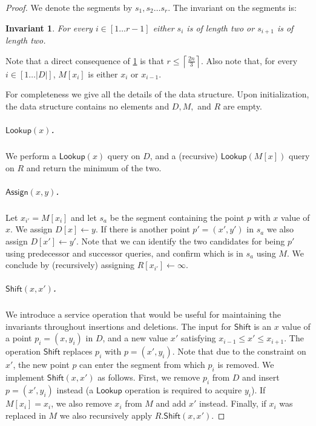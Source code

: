 \documentclass[a4paper,UKenglish,cleveref, autoref, thm-restate]{lipics-v2021}
\newcommand{\assign}{\leftarrow}
\newcommand{\AssignOp}{\mathsf{Assign}}
\newcommand{\ShiftOp}{\mathsf{Shift}}
\newcommand{\Lookup}{\mathsf{Lookup}}
\newcommand{\para}[1]{\vspace{-0.1in} \subparagraph*{#1}}
\newcommand{\ceil}[1]{\left\lceil{#1}\right\rceil}
\newtheorem{invariant}{Invariant}
\begin{document}
\begin{proof}
We denote the segments by $s_1,s_2 \ldots s_r$. The invariant on the segments is:
\begin{invariant}\label{inv:addminsegments}
    For every $i\in[1\ldots r-1]$ either $s_i$ is of length two or $s_{i+1}$ is of length two.
\end{invariant}
Note that a direct consequence of \cref{inv:addminsegments} is that $r \le \ceil{\frac{2n}{3}}$.
Also note that, for every $i\in [1\ldots |D|]$, $M[x_i]$ is either $x_i$ or $x_{i-1}$. 

For completeness we give all the details of the data structure.
Upon initialization, the data structure contains no elements and $D,M,$ and $R$ are empty.

\para{$\Lookup(x)$.}
We perform a $\Lookup(x)$ query on $D$, and a (recursive) $\Lookup(M[x])$ query on $R$ and return the minimum of the two.

\para{$\AssignOp(x,y)$.}
Let $x_{i'}=M[x_i]$ and let $s_a$ be the segment containing the point $p$ with $x$ value of $x$.
We assign $D[x] \assign y$. If there is another point $p'=(x',y')$ in $s_a$ we also  assign $D[x']\assign y'$.
Note that we can identify the two candidates for being $p'$ using predecessor and successor queries, and confirm which is in $s_a$ using $M$.
We conclude by (recursively) assigning $R[x_{i'}]\assign \infty$.

\para{$\ShiftOp(x,x')$.}
We introduce a service operation that would be useful for maintaining the invariants throughout insertions and deletions.
The input for $\ShiftOp$ is an $x$ value of a point $p_i = (x,y_i)$ in $D$, and a new value $x'$ satisfying $x_{i-1} \le  x' \le x_{i+1}$.
The operation $\ShiftOp$ replaces $p_i$ with $p = (x',y_i)$.
Note that due to the constraint on $x'$, the new point $p$ can enter the segment from which $p_i$ is removed.
We implement $\ShiftOp(x,x')$ as follows.
First, we remove $p_i$ from $D$ and insert $p = (x',y_i)$ instead (a $\Lookup$ operation is required to acquire $y_i$).
If $M[x_i] = x_i$, we also remove $x_i$ from $M$ and add $x'$ instead.
Finally, if $x_i$ was replaced in $M$ we also recursively apply $R.\ShiftOp(x,x')$.


\end{proof}
\end{document}
